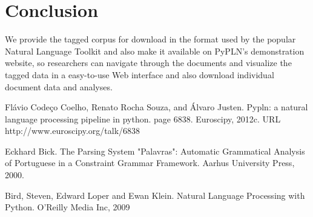 \documentclass[11pt,a4paper]{article}
\begin{document}
\section{Conclusion}

We provide the tagged corpus for download in the format used by the popular
Natural Language Toolkit\citep{NLTK} and also make it available on
PyPLN's demonstration website, so researchers can navigate through the
documents and visualize the tagged data in a easy-to-use Web interface and also
download individual document data and analyses.



\begin{thebibliography}{00}

Flávio Codeço Coelho, Renato Rocha Souza, and Álvaro Justen. Pypln: a natural
language processing pipeline in python. page 6838. Euroscipy, 2012c. URL
http://www.euroscipy.org/talk/6838

Eckhard Bick. The Parsing System "Palavras": Automatic Grammatical Analysis of Portuguese in a Constraint Grammar Framework. Aarhus University Press, 2000.

Bird, Steven, Edward Loper and Ewan Klein. Natural Language Processing with
Python. O’Reilly Media Inc, 2009


\end{thebibliography}
\end{document}
